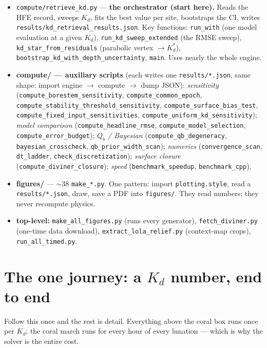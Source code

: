 \documentclass[11pt]{article}
\newcommand{\code}[1]{\texttt{\small #1}}
\newcommand{\fn}[1]{\texttt{\small\color{coral}#1}}
\begin{document}
\begin{itemize}
\item \fn{compute/retrieve_kd.py} — \textbf{the orchestrator (start here).}
  Reads the HFE record, sweeps $K_d$, fits the best value per site, bootstraps
  the CI, writes \code{results/kd_retrieval_results.json}. Key functions:
  \fn{run_with} (one model evaluation at a given $K_d$), \fn{run_kd_sweep_extended}
  (the RMSE sweep), \fn{kd_star_from_residuals} (parabolic vertex $\to K_d^{*}$),
  \fn{bootstrap_kd_with_depth_uncertainty}, \fn{main}. Uses nearly the whole engine.
\item \textbf{compute/ — auxiliary scripts} (each writes one \code{results/*.json},
  same shape: import engine $\to$ compute $\to$ dump JSON):
  \emph{sensitivity} (\code{compute_borestem_sensitivity},
  \code{compute_common_epoch}, \code{compute_stability_threshold_sensitivity},
  \code{compute_surface_bias_test}, \code{compute_fixed_input_sensitivities},
  \code{compute_uniform_kd_sensitivity});
  \emph{model comparison} (\code{compute_headline_rmse},
  \code{compute_model_selection}, \code{compute_error_budget});
  \emph{$Q_b$ / Bayesian} (\code{compute_qb_degeneracy}, \code{bayesian_crosscheck},
  \code{qb_prior_width_scan});
  \emph{numerics} (\code{convergence_scan}, \code{dt_ladder},
  \code{check_discretization});
  \emph{surface closure} (\code{compute_diviner_closure});
  \emph{speed} (\code{benchmark_speedup}, \code{benchmark_cpp}).
\item \textbf{figures/} — $\sim$38 \code{make_*.py}. One pattern: import
  \code{plotting.style}, read a \code{results/*.json}, draw, save a PDF into
  \code{figures/}. They read numbers; they never recompute physics.
\item \textbf{top-level:} \fn{make_all_figures.py} (runs every generator),
  \fn{fetch_diviner.py} (one-time data download),
  \fn{extract_lola_relief.py} (context-map crops), \fn{run_all_timed.py}.
\end{itemize}

\section{The one journey: a $K_d$ number, end to end}

Follow this once and the rest is detail. Everything above the coral box runs
once per $K_d$; the coral march runs for every hour of every lunation — which is
why the solver is the entire cost.
\end{document}
